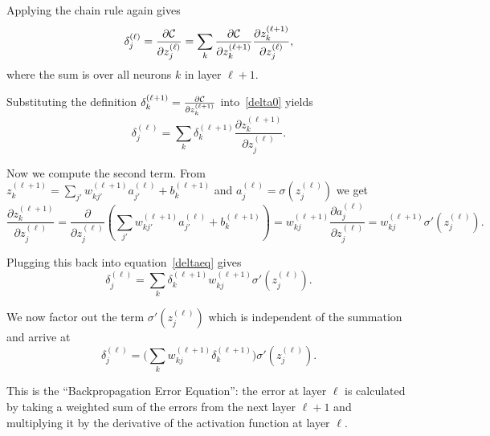 Applying the chain rule again gives
\begin{equation}
\label{delta0}    
\delta_j^{(\ell)} = \frac{\partial {\mathcal C}}{\partial z_j^{(\ell)}} = \sum_{k} \frac{\partial {\mathcal C}}{\partial z_k^{(\ell+1)}} \frac{\partial z_k^{(\ell+1)}}{\partial z_j^{(\ell)}},
\end{equation}
where the sum is over all neurons $k$ in layer $\ell+1$.

Substituting the definition $\delta_k^{(\ell+1)} = \frac{\partial {\mathcal C}}{\partial z_k^{(\ell+1)}}$ into~\eqref{delta0} yields
\begin{equation}
    \label{deltaeq}
\delta_j^{(\ell)} = \sum_{k} \delta_k^{(\ell+1)} \frac{\partial z_k^{(\ell+1)}}{\partial z_j^{(\ell)}}.
\end{equation}

Now we compute the second term. From $z_k^{(\ell+1)} = \sum_{j'} w_{kj'}^{(\ell+1)} a_{j'}^{(\ell)} + b_k^{(\ell+1)}$ and $a_j^{(\ell)} = \sigma(z_j^{(\ell)})$ we get
$$\frac{\partial z_k^{(\ell+1)}}{\partial z_j^{(\ell)}} = \frac{\partial}{\partial z_j^{(\ell)}} \left( \sum_{j'} w_{kj'}^{(\ell+1)} a_{j'}^{(\ell)} + b_k^{(\ell+1)} \right) = w_{kj}^{(\ell+1)} \frac{\partial a_j^{(\ell)}}{\partial z_j^{(\ell)}} = w_{kj}^{(\ell+1)} \sigma'(z_j^{(\ell)}).$$

Plugging this back into equation~\eqref{deltaeq} gives
$$\delta_j^{(\ell)} = \sum_{k} \delta_k^{(\ell+1)} w_{kj}^{(\ell+1)} \sigma'(z_j^{(\ell)}).$$

We now factor out the term $\sigma'(z_j^{(\ell)})$ which is independent of the summation and arrive at
\begin{equation}
    \label{BP-4}
\delta_j^{(\ell)} = \Big( \sum_{k} w_{kj}^{(\ell+1)} \delta_k^{(\ell+1)} \Big) \sigma'(z_j^{(\ell)}).
\end{equation}

This is the ``Backpropagation Error Equation'': the error at layer $\ell$ is calculated by taking a weighted sum of the errors from the next layer $\ell+1$ and multiplying it by the derivative of the activation function at layer $\ell$.


